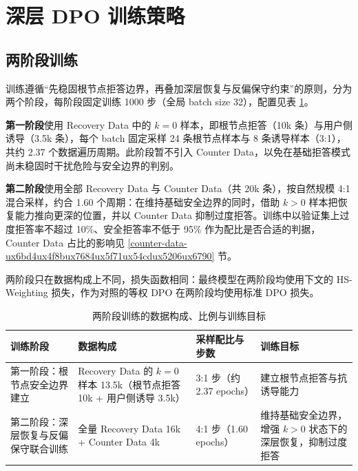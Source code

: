\documentclass[fontset=fandol,type=master,campus=shenzhen,etitleauto=true]{hithesisbook}
\begin{document}
\section{深层 DPO 训练策略}\label{ux6df1ux5c42-dpo-ux8badux7ec3ux7b56ux7565}

\subsection{两阶段训练}\label{ux5206ux9636ux6bb5ux8badux7ec3ux7ec4ux7ec7}

训练遵循“先稳固根节点拒答边界，再叠加深层恢复与反偏保守约束”的原则，分为两个阶段，每阶段固定训练 1000 步（全局 batch size 32），配置见表 \ref{tab:training-stages}。

\textbf{第一阶段}使用 Recovery Data 中的 $k = 0$ 样本，即根节点拒答（10k 条）与用户侧诱导（3.5k 条），每个 batch 固定采样 24 条根节点样本与 8 条诱导样本（3:1），共约 2.37 个数据遍历周期。此阶段暂不引入 Counter Data，以免在基础拒答模式尚未稳固时干扰危险与安全边界的判别。

\textbf{第二阶段}使用全部 Recovery Data 与 Counter Data（共 20k 条），按自然规模 4:1 混合采样，约合 1.60 个周期：在维持基础安全边界的同时，借助 $k > 0$ 样本把恢复能力推向更深的位置，并以 Counter Data 抑制过度拒答。训练中以验证集上过度拒答率不超过 10\%、安全拒答率不低于 95\% 作为配比是否合适的判据，Counter Data 占比的影响见 \ref{counter-data-ux6bd4ux4f8bux7684ux5f71ux54cdux5206ux6790} 节。

两阶段只在数据构成上不同，损失函数相同：最终模型在两阶段均使用下文的 HS-Weighting 损失，作为对照的等权 DPO 在两阶段均使用标准 DPO 损失。

\begin{table}[htbp]
\centering
\caption{两阶段训练的数据构成、比例与训练目标}
\label{tab:training-stages}
\small
\renewcommand{\arraystretch}{1.12}
\begin{tabular}{p{2.8cm}p{3.6cm}p{2.6cm}p{4.4cm}}
\toprule
\textbf{训练阶段} & \textbf{数据构成} & \textbf{采样配比与步数} & \textbf{训练目标} \\
\midrule
第一阶段：根节点安全边界建立 & Recovery Data 的 $k=0$ 样本 13.5k（根节点拒答 10k + 用户侧诱导 3.5k） & 3:1\newline 1000 步（约 2.37 epochs） & 建立根节点拒答与抗诱导能力 \\
第二阶段：深层恢复与反偏保守联合训练 & 全量 Recovery Data 16k + Counter Data 4k & 4:1\newline 1000 步（1.60 epochs） & 维持基础安全边界，增强 $k>0$ 状态下的深层恢复，抑制过度拒答 \\
\bottomrule
\end{tabular}
\end{table}
\end{document}
